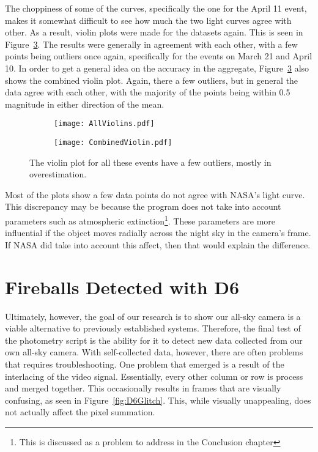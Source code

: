 The choppiness of some of the curves, specifically the one for the April 11 event, makes it somewhat difficult to see how much the two light curves agree with other. As a result, violin plots were made for the datasets again. This is seen in Figure~\ref{fig:twoviolin}. The results were generally in agreement with each other, with a few points being outliers once again, specifically for the events on March 21 and April 10. In order to get a general idea on the accuracy in the aggregate, Figure~\ref{fig:twoviolin} also shows the combined violin plot. Again, there a few outliers, but in general the data agree with each other, with the majority of the points being within 0.5 magnitude in either direction of the mean.

\begin{figure}[ht!]
\centering
\begin{subfigure}{.5\textwidth}
	\centering
	\texttt{[image: AllViolins.pdf]}
	\label{fig:AllViolins}
\end{subfigure}%
\begin{subfigure}{.5\textwidth}
	\centering
	\texttt{[image: CombinedViolin.pdf]}
	\label{fig:CombinedViolin}
\end{subfigure}
\caption{The violin plot for all these events have a few outliers, mostly in overestimation.}
\label{fig:twoviolin}
\end{figure}

Most of the plots show a few data points do not agree with NASA's light curve. This discrepancy may be because the program does not take into account parameters such as atmospheric extinction\footnote{This is discussed as a problem to address in the Conclusion chapter}. These parameters are more influential if the object moves radially across the night sky in the camera's frame. If NASA did take into account this affect, then that would explain the difference. 

\section{Fireballs Detected with D6}

Ultimately, however, the goal of our research is to show our all-sky camera is a viable alternative to previously established systems. Therefore, the final test of the photometry script is the ability for it to detect new data collected from our own all-sky camera. With self-collected data, however, there are often problems that requires troubleshooting. One problem that emerged is a result of the interlacing of the video signal. Essentially, every other column or row is process and merged together. This occasionally results in frames that are visually confusing, as seen in Figure~\ref{fig:D6Glitch}. This, while visually unappealing, does not actually affect the pixel summation.

